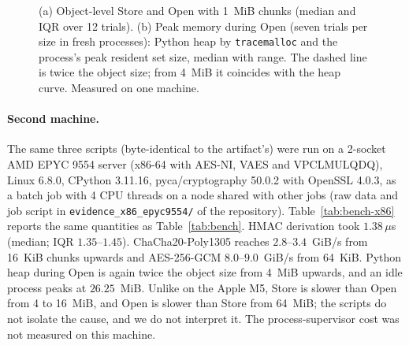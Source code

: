 \documentclass[pdflatex,sn-mathphys-num]{sn-jnl}
\newcommand{\code}[1]{\texttt{#1}}
\newcommand{\fpath}[1]{\nolinkurl{#1}}%
\theoremstyle{plain}
\begin{document}
\begin{figure}[htbp]
\centering
\figbox{}
\caption{(a) Object-level Store and Open with 1~MiB chunks (median and IQR over 12 trials). (b) Peak memory during Open (seven trials per size in fresh processes): Python heap by \code{tracemalloc} and the process's peak resident set size, median with range. The dashed line is twice the object size; from 4~MiB it coincides with the heap curve. Measured on one machine.}\label{fig:objects}
\end{figure}

\paragraph{Second machine.}
The same three scripts (byte-identical to the artifact's) were run on a 2-socket AMD EPYC 9554 server (x86-64 with AES-NI, VAES and VPCLMULQDQ), Linux 6.8.0, CPython 3.11.16, pyca/cryptography 50.0.2 with OpenSSL 4.0.3, as a batch job with 4 CPU threads on a node shared with other jobs (raw data and job script in \fpath{evidence_x86_epyc9554/} of the repository). Table~\ref{tab:bench-x86} reports the same quantities as Table~\ref{tab:bench}. HMAC derivation took $1.38\,\mu$s (median; IQR $1.35$--$1.45$). ChaCha20-Poly1305 reaches $2.8$--$3.4$~GiB/s from 16~KiB chunks upwards and AES-256-GCM $8.0$--$9.0$~GiB/s from 64~KiB. Python heap during Open is again twice the object size from 4~MiB upwards, and an idle process peaks at $26.25$~MiB. Unlike on the Apple M5, Store is slower than Open from 4 to 16~MiB, and Open is slower than Store from 64~MiB; the scripts do not isolate the cause, and we do not interpret it. The process-supervisor cost was not measured on this machine.
\end{document}

